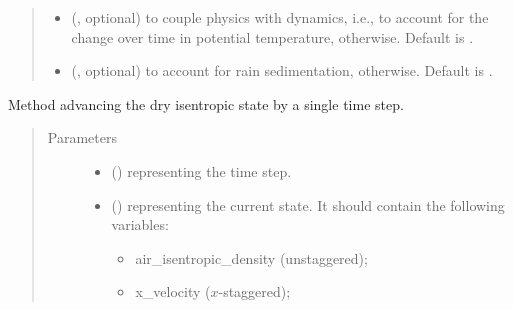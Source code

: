 \documentclass[letterpaper,10pt,english]{sphinxmanual}
\begin{document}
\begin{fulllineitems}
\begin{fulllineitems}
\begin{quote}
\begin{description}
\begin{itemize}
\item {} 
 (, optional) \textendash{}  to couple physics with dynamics, i.e., to account for the change over time in potential
temperature,  otherwise. Default is .

\item {} 
 (, optional) \textendash{}  to account for rain sedimentation,  otherwise. Default is .

\end{itemize}

\end{description}\end{quote}

\end{fulllineitems}


\begin{fulllineitems}
\label{\detokenize{api:tasmania.dycore.dycore_isentropic_nonconservative.DynamicalCoreIsentropicNonconservative._step_dry}}
Method advancing the dry isentropic state by a single time step.
\begin{quote}\begin{description}
\item[{Parameters}] \leavevmode\begin{itemize}
\item {} 
 () \textendash{}  representing the time step.

\item {} 
 () \textendash{} 
{\hyperref[\detokenize{api:tasmania.storages.state_isentropic.StateIsentropic}]{}} representing the current state.
It should contain the following variables:
\begin{itemize}
\item {} 
air\_isentropic\_density (unstaggered);

\item {} 
x\_velocity (\(x\)-staggered);


\end{itemize}
\end{itemize}
\end{description}
\end{quote}
\end{fulllineitems}
\end{fulllineitems}
\end{document}
